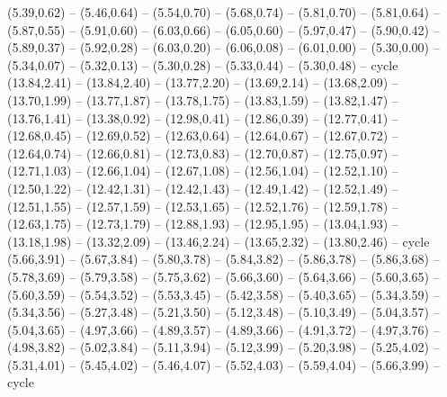 \expandafter\def\csname geo:gebiet:TUN\endcsname{
  (5.39,0.62) -- (5.46,0.64) -- (5.54,0.70) -- (5.68,0.74) -- (5.81,0.70) -- (5.81,0.64) -- (5.87,0.55) -- (5.91,0.60) -- (6.03,0.66) -- (6.05,0.60) -- (5.97,0.47) -- (5.90,0.42) -- (5.89,0.37) -- (5.92,0.28) -- (6.03,0.20) -- (6.06,0.08) -- (6.01,0.00) -- (5.30,0.00) -- (5.34,0.07) -- (5.32,0.13) -- (5.30,0.28) -- (5.33,0.44) -- (5.30,0.48) -- cycle}
\expandafter\def\csname geo:gebiet:SYR\endcsname{
  (13.84,2.41) -- (13.84,2.40) -- (13.77,2.20) -- (13.69,2.14) -- (13.68,2.09) -- (13.70,1.99) -- (13.77,1.87) -- (13.78,1.75) -- (13.83,1.59) -- (13.82,1.47) -- (13.76,1.41) -- (13.38,0.92) -- (12.98,0.41) -- (12.86,0.39) -- (12.77,0.41) -- (12.68,0.45) -- (12.69,0.52) -- (12.63,0.64) -- (12.64,0.67) -- (12.67,0.72) -- (12.64,0.74) -- (12.66,0.81) -- (12.73,0.83) -- (12.70,0.87) -- (12.75,0.97) -- (12.71,1.03) -- (12.66,1.04) -- (12.67,1.08) -- (12.56,1.04) -- (12.52,1.10) -- (12.50,1.22) -- (12.42,1.31) -- (12.42,1.43) -- (12.49,1.42) -- (12.52,1.49) -- (12.51,1.55) -- (12.57,1.59) -- (12.53,1.65) -- (12.52,1.76) -- (12.59,1.78) -- (12.63,1.75) -- (12.73,1.79) -- (12.88,1.93) -- (12.95,1.95) -- (13.04,1.93) -- (13.18,1.98) -- (13.32,2.09) -- (13.46,2.24) -- (13.65,2.32) -- (13.80,2.46) -- cycle}
\expandafter\def\csname geo:gebiet:CHE\endcsname{
  (5.66,3.91) -- (5.67,3.84) -- (5.80,3.78) -- (5.84,3.82) -- (5.86,3.78) -- (5.86,3.68) -- (5.78,3.69) -- (5.79,3.58) -- (5.75,3.62) -- (5.66,3.60) -- (5.64,3.66) -- (5.60,3.65) -- (5.60,3.59) -- (5.54,3.52) -- (5.53,3.45) -- (5.42,3.58) -- (5.40,3.65) -- (5.34,3.59) -- (5.34,3.56) -- (5.27,3.48) -- (5.21,3.50) -- (5.12,3.48) -- (5.10,3.49) -- (5.04,3.57) -- (5.04,3.65) -- (4.97,3.66) -- (4.89,3.57) -- (4.89,3.66) -- (4.91,3.72) -- (4.97,3.76) -- (4.98,3.82) -- (5.02,3.84) -- (5.11,3.94) -- (5.12,3.99) -- (5.20,3.98) -- (5.25,4.02) -- (5.31,4.01) -- (5.45,4.02) -- (5.46,4.07) -- (5.52,4.03) -- (5.59,4.04) -- (5.66,3.99) -- cycle}
